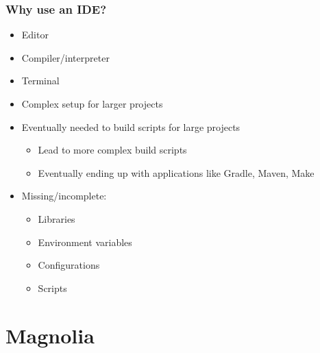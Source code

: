 \begin{frame}
  \frametitle{Why use an IDE?}
  \begin{itemize}
      \pause
    \item Editor
      \pause
    \item Compiler/interpreter
      \pause
    \item Terminal
      \pause
    \item Complex setup for larger projects
      \pause
    \item Eventually needed to build scripts for large projects
      \begin{itemize}
        \item Lead to more complex build scripts
        \item Eventually ending up with applications like Gradle, Maven, Make
      \end{itemize}
      \pause
    \item Missing/incomplete:
      \pause
      \begin{itemize}
        \item Libraries
        \item Environment variables
        \item Configurations
        \item Scripts
          \pause
      \end{itemize}
  \end{itemize}
\end{frame}

\section{Magnolia}
\SectionPage

